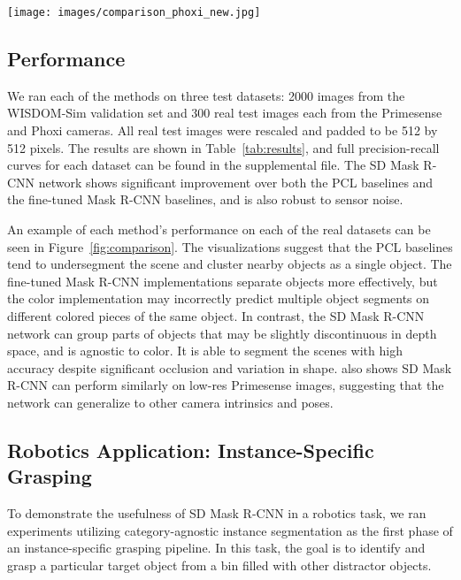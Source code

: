 \documentclass[letterpaper, 10 pt, conference]{ieeeconf}  \pdfoutput=1
\numberwithin{equation}{section}
\begin{document}
\begin{figure*}[t!]
    \vspace{8pt}
    \centering
    \texttt{[image: images/comparison\_phoxi\_new.jpg]}
    \caption{Images from both sensors with ground truth and object masks generated by each method. For the baseline methods, the better performing method was chosen for each scenario. While the baseline methods tend to undersegment (PCL) or oversegment (Fine-Tuned Mask R-CNN), SD Mask R-CNN segments the objects correctly.}
  \label{fig:comparison} 
\end{figure*}

\subsection{Performance}
We ran each of the methods on three test datasets: 2000 images from the WISDOM-Sim validation set and 300 real test images each from the Primesense and Phoxi cameras. All real test images were rescaled and padded to be 512 by 512 pixels.
The results are shown in Table~\ref{tab:results}, and full precision-recall curves for each dataset can be found in the supplemental file.
The SD Mask R-CNN network shows significant improvement over both the PCL baselines and the fine-tuned Mask R-CNN baselines, and is also robust to sensor noise.

An example of each method's performance on each of the real datasets can be seen in Figure~\ref{fig:comparison}.
The visualizations suggest that the PCL baselines tend to undersegment the scene and cluster nearby objects as a single object.
The fine-tuned Mask R-CNN implementations separate objects more effectively, but the color implementation may incorrectly predict multiple object segments on different colored pieces of the same object.
In contrast, the SD Mask R-CNN network can group parts of objects that may be slightly discontinuous in depth space, and is agnostic to color.
It is able to segment the scenes with high accuracy despite significant occlusion and variation in shape.
 also shows SD Mask R-CNN can perform similarly on low-res Primesense images, suggesting that the network can generalize to other camera intrinsics and poses.




\subsection{Robotics Application: Instance-Specific Grasping}
To demonstrate the usefulness of SD Mask R-CNN in a robotics task, we ran experiments utilizing category-agnostic instance segmentation as the first phase of an instance-specific grasping pipeline.
In this task, the goal is to identify and grasp a particular target object from a bin filled with other distractor objects.
\end{document}
